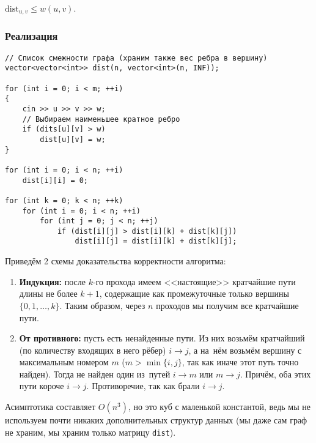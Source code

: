 \begin{lemma}
    $\mathrm{dist}_{u, v} \leqslant w(u, v)$.
\end{lemma}

\subsubsection{Реализация}

\begin{verbatim}
// Список смежности графа (храним также вес ребра в вершину)
vector<vector<int>> dist(n, vector<int>(n, INF));

for (int i = 0; i < m; ++i)
{
    cin >> u >> v >> w;
    // Выбираем наименьшее кратное ребро
    if (dits[u][v] > w)
        dist[u][v] = w;
}

for (int i = 0; i < n; ++i)
    dist[i][i] = 0;

for (int k = 0; k < n; ++k)
    for (int i = 0; i < n; ++i)
        for (int j = 0; j < n; ++j)
            if (dist[i][j] > dist[i][k] + dist[k][j])
                dist[i][j] = dist[i][k] + dist[k][j];
\end{verbatim}

Приведём 2 схемы доказательства корректности алгоритма:

\begin{enumerate}
    \item \textbf{Индукция: } после $k$-го прохода имеем <<настоящие>> кратчайшие пути длины не более $k + 1$, содержащие как промежуточные только вершины $\{0, 1, \ldots, k\}$. Таким образом, через $n$ проходов мы получим все кратчайшие пути.
    \item \textbf{От противного:} пусть есть ненайденные пути. Из них возьмём кратчайший (по количеству входящих в него рёбер) $i\rightarrow j$, а на~нём возьмём вершину с максимальным номером $m$ ($m > \min\{i, j\}$, так как иначе этот путь точно найден). Тогда не найден один из~путей $i\rightarrow m$ или $m \rightarrow j$. Причём, оба этих пути короче $i \rightarrow j$. Противоречие, так как брали $i \rightarrow j$.
\end{enumerate}

Асимптотика составляет $O(n^3)$, но это куб с маленькой константой, ведь мы не используем почти никаких дополнительных структур данных (мы даже сам граф не храним, мы храним только матрицу \texttt{dist}). 


